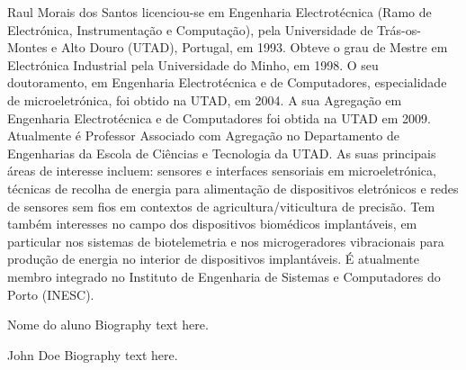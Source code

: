 \documentclass[journal, twoside, a4paper]{IEEEtran_LEEC_v1}
\begin{document}
\begin{IEEEbiography}{Raul Morais dos Santos}
licenciou-se em Engenharia Electrotécnica (Ramo de Electrónica, Instrumentação e Computação), pela Universidade de Trás-os-Montes e Alto Douro (UTAD), Portugal, em 1993. Obteve o grau de Mestre em Electrónica Industrial pela Universidade do Minho, em 1998. O seu doutoramento, em Engenharia Electrotécnica e de Computadores, especialidade de microeletrónica, foi obtido na UTAD, em 2004. A sua Agregação em Engenharia Electrotécnica e de Computadores foi obtida na UTAD em 2009. Atualmente é Professor Associado com Agregação no Departamento de Engenharias da Escola de Ciências e Tecnologia da UTAD. As suas principais áreas de interesse incluem: sensores e interfaces sensoriais em microeletrónica, técnicas de recolha de energia para alimentação de dispositivos eletrónicos e redes de sensores sem fios em contextos de agricultura/viticultura de precisão. Tem também interesses no campo dos dispositivos biomédicos implantáveis, em particular nos sistemas de biotelemetria e nos microgeradores vibracionais para produção de energia no interior de dispositivos implantáveis. É atualmente membro integrado no Instituto de Engenharia de Sistemas e Computadores do Porto (INESC).
\end{IEEEbiography}

\begin{IEEEbiography}{Nome do aluno}
Biography text here.
\end{IEEEbiography}

\begin{IEEEbiographynophoto}{John Doe}
Biography text here.
\end{IEEEbiographynophoto}

\vfill
\end{document}
